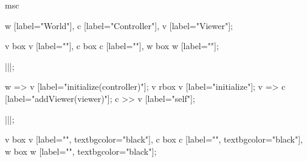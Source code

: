 \begin{msc}
msc
{

w [label="World"],
c [label="Controller"],
v [label="Viewer"];

v box v [label=""],
c box c [label=""],
w box w [label=""];

|||;

w => v [label="initialize(controller)"];
v rbox v [label="initialize"];
v => c [label="addViewer(viewer)"];
c >> v [label="self"];

|||;

v box v [label="", textbgcolor="black"],
c box c [label="", textbgcolor="black"],
w box w [label="", textbgcolor="black"];

}
\end{msc}
